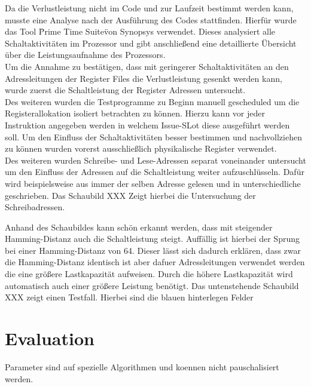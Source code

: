 Da die Verlustleistung nicht im Code und zur Laufzeit bestimmt werden kann, musste eine Analyse nach der Ausführung des Codes stattfinden. Hierfür wurde das Tool \"Prime Time Suite\" von Synopsys verwendet. Dieses analysiert alle Schaltaktivitäten im Prozessor und gibt anschließend eine detaillierte Übersicht über die Leistungsaufnahme des Prozessors.\\
Um die Annahme zu bestätigen, dass mit geringerer Schaltaktivitäten an den Adressleitungen der Register Files die Verlustleistung gesenkt werden kann, wurde zuerst die Schaltleistung der Register Adressen untersucht.\\
Des weiteren wurden die Testprogramme zu Beginn manuell gescheduled um die Registerallokation isoliert betrachten zu können. Hierzu kann vor jeder Instruktion angegeben werden in welchem Issue-SLot diese ausgeführt werden soll. Um den Einfluss der Schaltaktivitäten besser bestimmen und nachvollziehen zu können wurden vorerst ausschließlich physikalische Register verwendet. \\
Des weiteren wurden Schreibe- und Lese-Adressen separat voneinander untersucht um den Einfluss der Adressen auf die Schaltleistung weiter aufzuschlüsseln. Dafür wird beispielsweise aus immer der selben Adresse gelesen und in unterschiedliche geschrieben. Das Schaubild XXX Zeigt hierbei die Untersuchung der Schreibadressen.

%	
Anhand des Schaubildes kann schön erkannt werden, dass mit steigender Hamming-Distanz auch die Schaltleistung steigt. Auffällig ist hierbei der Sprung bei einer Hamming-Distanz von 64. Dieser lässt sich dadurch erklären, dass zwar die Hamming-Distanz identisch ist aber dafuer Adressleitungen verwendet werden die eine größere Lastkapazität aufweisen. Durch die höhere Lastkapazität wird automatisch auch einer größere Leistung benötigt.
Das untenstehende Schaubild XXX zeigt einen Testfall. Hierbei sind die blauen hinterlegen Felder 

\section{Evaluation}
\label{sec:evalutation_verification}

Parameter sind auf spezielle Algorithmen und koennen nicht pauschalisiert werden.